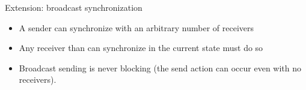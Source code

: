 \documentclass[aspectratio=169]{beamer}
\begin{document}
\begin{slide}{Extension: broadcast synchronization}
\small



\begin{itemize}
\item A sender  can synchronize with an arbitrary number of receivers 
\item Any receiver than can synchronize in the current state must do so
\item Broadcast sending is never blocking (the send action can occur even with no receivers).
\end{itemize}

\end{slide}
\end{document}
